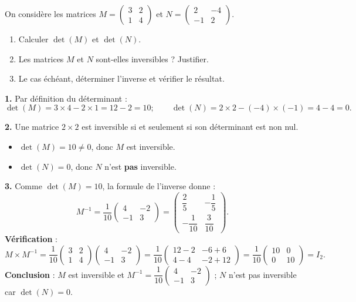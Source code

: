 \documentclass[11pt]{article}
\newcommand{\cle}[1]{{\popxbold\color{popdark}#1}}
\begin{document}
\begin{exoresolu}
On considère les matrices $M=\begin{pmatrix} 3 & 2 \\ 1 & 4 \end{pmatrix}$ et $N=\begin{pmatrix} 2 & -4 \\ -1 & 2 \end{pmatrix}$.
\begin{enumerate}
\item Calculer $\det(M)$ et $\det(N)$.
\item Les matrices $M$ et $N$ sont-elles inversibles ? Justifier.
\item Le cas échéant, déterminer l'inverse et vérifier le résultat.
\end{enumerate}
\tcblower
\textbf{1.} Par définition du déterminant :
\[ \det(M)=3\times 4-2\times 1=12-2=10 ; \qquad \det(N)=2\times 2-(-4)\times(-1)=4-4=0. \]

\textbf{2.} Une matrice $2\times 2$ est inversible si et seulement si son déterminant est non nul.
\begin{itemize}
\item $\det(M)=10\neq 0$, donc $M$ est \cle{inversible}.
\item $\det(N)=0$, donc $N$ n'est \textbf{pas} inversible.
\end{itemize}

\textbf{3.} Comme $\det(M)=10$, la formule de l'inverse donne :
\[ M^{-1}=\frac{1}{10}\begin{pmatrix} 4 & -2 \\ -1 & 3 \end{pmatrix}=\begin{pmatrix} \dfrac{2}{5} & -\dfrac{1}{5} \\[6pt] -\dfrac{1}{10} & \dfrac{3}{10} \end{pmatrix}. \]
\textbf{Vérification} :
\[ M\times M^{-1}=\frac{1}{10}\begin{pmatrix} 3 & 2 \\ 1 & 4 \end{pmatrix}\begin{pmatrix} 4 & -2 \\ -1 & 3 \end{pmatrix}=\frac{1}{10}\begin{pmatrix} 12-2 & -6+6 \\ 4-4 & -2+12 \end{pmatrix}=\frac{1}{10}\begin{pmatrix} 10 & 0 \\ 0 & 10 \end{pmatrix}=I_2. \]
\textbf{Conclusion} : $M$ est inversible et $M^{-1}=\dfrac{1}{10}\begin{pmatrix} 4 & -2 \\ -1 & 3 \end{pmatrix}$ ; $N$ n'est pas inversible car $\det(N)=0$.
\end{exoresolu}
\end{document}
